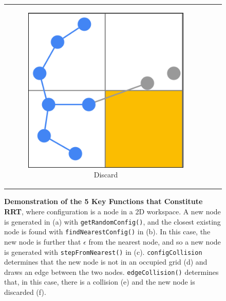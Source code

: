 \begin{figure}[t!]
\begin{centering}
\begin{tabular}{ccc}
    \begin{subfigure}{0.3\linewidth}
    \includegraphics[width=\linewidth]{chapters/chapter2/img/keyfunctions/functions6.png}
    \caption{Discard}
    \label{rrt_functions_f}
    \end{subfigure} \\

\end{tabular}
\caption[Demonstration of the 5 Key Functions that Constitute RRT]{\textbf{Demonstration of the 5 Key Functions that Constitute RRT}, where configuration is a node in a 2D workspace. A new node is generated in (a) with \texttt{getRandomConfig()}, and the closest existing node is found with \texttt{findNearestConfig()} in (b). In this case, the new node is further that $\epsilon$ from the nearest node, and so a new node is generated with \texttt{stepFromNearest()} in (c). \texttt{configCollision} determines that the new node is not in an occupied grid (d) and draws an edge between the two nodes. \texttt{edgeCollision()} determines that, in this case, there is a collision (e) and the new node is discarded (f).}
\label{fig:rrt_functions}
\end{centering}
\end{figure}